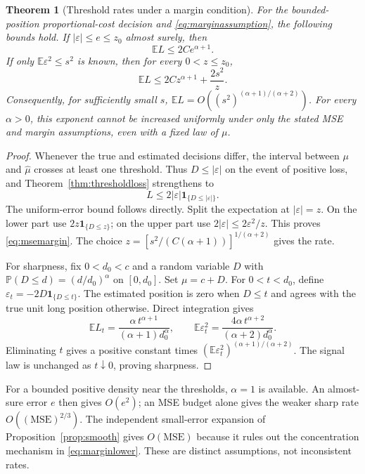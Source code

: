 \documentclass[11pt]{article}
\theoremstyle{plain}
\newtheorem{theorem}{Theorem}[section]
\theoremstyle{definition}
\theoremstyle{remark}
\newcommand{\E}{\mathbb E}
\begin{document}
\begin{theorem}[Threshold rates under a margin condition]\label{thm:margin}
For the bounded-position proportional-cost decision and
\eqref{eq:marginassumption}, the following bounds hold.
If \(|\varepsilon|\le e\le z_0\) almost surely, then
\[
\E L\le2C e^{\alpha+1}.
\]
If only \(\E\varepsilon^2\le s^2\) is known, then for every
\(0<z\le z_0\),
\begin{equation}\label{eq:msemargin}
\E L\le2Cz^{\alpha+1}+\frac{2s^2}{z}.
\end{equation}
Consequently, for sufficiently small \(s\),
\(\E L=O((s^2)^{(\alpha+1)/(\alpha+2)})\).
For every \(\alpha>0\), this exponent cannot be increased uniformly
under only the stated MSE and margin assumptions, even with a fixed
law of \(\mu\).
\end{theorem}
\begin{proof}
Whenever the true and estimated decisions differ, the interval
between \(\mu\) and \(\widehat\mu\) crosses at least one threshold.
Thus \(D\le|\varepsilon|\) on the event of positive loss, and
Theorem~\ref{thm:thresholdloss} strengthens to
\[
L\le2|\varepsilon|\mathbf1_{\{D\le|\varepsilon|\}}.
\]
The uniform-error bound follows directly. Split the expectation
at \(|\varepsilon|=z\). On the lower part use
\(2z\mathbf1_{\{D\le z\}}\); on the upper part use
\(2|\varepsilon|\le2\varepsilon^2/z\). This proves
\eqref{eq:msemargin}. The choice
\(z=[s^2/(C(\alpha+1))]^{1/(\alpha+2)}\) gives the rate.

For sharpness, fix \(0<d_0<c\) and a random variable \(D\) with
\(\mathbb P(D\le d)=(d/d_0)^\alpha\) on \([0,d_0]\).
Set \(\mu=c+D\). For \(0<t<d_0\), define
\(\varepsilon_t=-2D\mathbf1_{\{D\le t\}}\).
The estimated position is zero when \(D\le t\) and agrees with
the true unit long position otherwise. Direct integration gives
\begin{equation}\label{eq:marginlower}
\E L_t=\frac{\alpha\,t^{\alpha+1}}
                   {(\alpha+1)d_0^\alpha},\qquad
\E\varepsilon_t^2=\frac{4\alpha\,t^{\alpha+2}}
                   {(\alpha+2)d_0^\alpha}.
\end{equation}
Eliminating \(t\) gives a positive constant times
\((\E\varepsilon_t^2)^{(\alpha+1)/(\alpha+2)}\).
The signal law is unchanged as \(t\downarrow0\), proving sharpness.
\end{proof}

For a bounded positive density near the thresholds, \(\alpha=1\)
is available. An almost-sure error \(e\) then gives \(O(e^2)\);
an MSE budget alone gives the weaker sharp rate
\(O((\mathrm{MSE})^{2/3})\). The independent small-error expansion
of Proposition~\ref{prop:smooth} gives \(O(\mathrm{MSE})\) because
it rules out the concentration mechanism in \eqref{eq:marginlower}.
These are distinct assumptions, not inconsistent rates.
\end{document}
